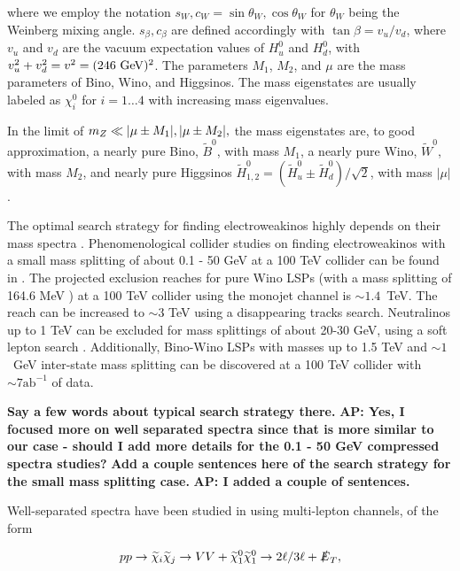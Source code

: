 \documentclass[a4paper,11pt]{article}
\newcommand{\Shufang}[1]{{\bf\color{Maroon}  #1}}
\newcommand{\Adarsh}[1]{{\bf\color{RoyalBlue} AP: #1}}
\renewcommand{\H}{\widetilde{H}^0}
\newcommand{\B}{\widetilde{B}^0}
\newcommand{\N}{\widetilde{\chi}^0}
\newcommand{\met}{{\slashed{E}_T}}
\begin{document}
\noindent where we employ the notation $s_W, c_W = \sin\theta_W, \cos\theta_W$
for $\theta_W$ being the Weinberg mixing angle. $s_\beta, c_\beta$ are defined
accordingly with $\tan\beta= v_u/v_d$, where $v_u$ and $v_d$ are the vacuum
expectation values of $H_u^0$ and $H_d^0$, with $v_u^2+v_d^2=v^2=(246\ {\rm
GeV})^2$. The parameters $M_1$, $M_2$, and $\mu$ are the mass parameters of
Bino, Wino, and Higgsinos.  The mass eigenstates are usually labeled as
$\chi_i^0$ for $i=1 \ldots 4$ with increasing mass eigenvalues.

In the limit of $m_Z \ll |\mu\pm M_1|, |\mu\pm M_2|,$ the mass eigenstates
are, to good approximation, a nearly pure Bino, $\B$, with mass $M_1$,
a nearly pure Wino, $\widetilde{W}^0$, with mass $M_2$, and nearly pure Higgsinos
$\H_{1,2} = (\H_u \pm \H_d)/\sqrt{2}$, with mass
$|\mu|$. 

The optimal search strategy for finding electroweakinos   highly depends on
their mass spectra \cite{Han:2013kza}.  Phenomenological collider studies on
finding electroweakinos with a small mass splitting of about 0.1 - 50 GeV at a
100 TeV collider can be found in \cite{Low:2014cba, Bramante:2014tba,
Berlin:2015aba, Cirelli:2014dsa}. The projected exclusion reaches for pure Wino
LSPs (with a mass splitting of 164.6 MeV \cite{Ibe:2012sx}) at a 100 TeV
collider using the monojet channel is $\sim1.4$~TeV.  The reach
can be increased to $\sim3$ TeV using a disappearing tracks search.
Neutralinos up to 1 TeV can be excluded for mass splittings of about 20-30 GeV,
using a soft lepton search \cite{Low:2014cba}. Additionally, Bino-Wino LSPs
with masses up to 1.5 TeV and $\sim 1$~GeV inter-state mass splitting can be
discovered at a 100 TeV collider with $\sim7 \text{ab}^{-1}$ of data. 
  
  \Shufang{Say a few words about typical
  search strategy there.} \Adarsh{Yes, I focused more on well separated spectra
  since that is more similar to our case - should I add more details for the
  0.1 - 50 GeV compressed spectra studies?} \Shufang{Add a couple sentences
  here of the search strategy for the small mass splitting case.}
  \Adarsh{I added a couple of sentences.}

  Well-separated spectra have been studied in \cite{Gori:2014oua,
  Acharya:2014pua} using multi-lepton channels, of the form 

\begin{align}
  pp\rightarrow \widetilde{\chi}_i\widetilde{\chi}_j\rightarrow VV +
  \N_1\N_1\rightarrow 2\ell/3\ell + \met,
\end{align}
\end{document}
